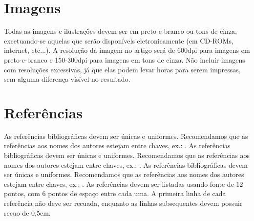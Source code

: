 \documentclass[11.5pt]{article}
\begin{document}
\section{Imagens}

Todas as imagens e ilustrações devem ser em preto-e-branco ou tons de cinza, excetuando-se aquelas que serão disponívels eletronicamente (em CD-ROMs, internet, etc...). A resolução da imagem no artigo será de 600dpi para imagens em preto-e-branco e 150-300dpi para imagens em tons de cinza. Não incluir imagens com resoluções excessivas, já que elas podem levar horas para serem impressas, sem alguma diferença visível no resultado.

\section{Referências}

As referências bibliográficas devem ser únicas e uniformes. Recomendamos que as referências aos nomes dos autores estejam entre chaves, ex.: \cite{knuth:84}.
As referências bibliográficas devem ser únicas e uniformes. Recomendamos que as referências aos nomes dos autores estejam entre chaves, ex.: \cite{boulic:91}.
As referências bibliográficas devem ser únicas e uniformes. Recomendamos que as referências aos nomes dos autores estejam entre chaves, ex.: \cite{smith:99}.
As referências devem ser listadas usando fonte de 12 pontos, com 6 pontos de espaço entre cada uma. A primeira linha de cada referência não deve ser recuada, enquanto as linhas subsequentes devem possuir recuo de 0,5cm.



\end{document}

